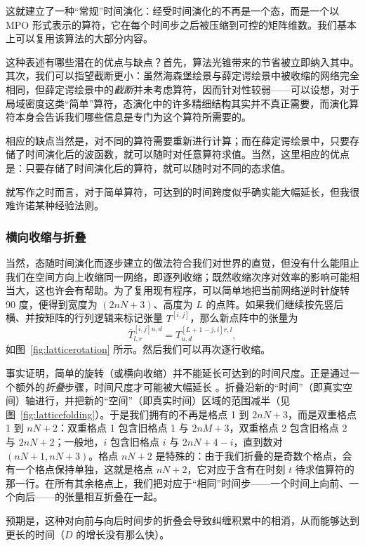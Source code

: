 \documentclass[a4paper,10pt,oneside,onecolumn,1p,times]{elsarticle}
\begin{document}
这就建立了一种“常规”时间演化：经受时间演化的不再是一个态，而是一个以 MPO 形式表示的算符，它在每个时间步之后被压缩到可控的矩阵维数。我们基本上可以复用该算法的大部分内容。

这种表述有哪些潜在的优点与缺点？首先，算法光锥带来的节省被立即纳入其中。其次，我们可以指望截断更小：虽然海森堡绘景与薛定谔绘景中被收缩的网络完全相同，但薛定谔绘景中的{\em 截断}并未考虑算符，因而针对性较弱——可以设想，对于局域密度这类“简单”算符，态演化中的许多精细结构其实并不真正需要，而演化算符本身会告诉我们哪些信息是专门为这个算符所需要的。

相应的缺点当然是，对不同的算符需要重新进行计算；而在薛定谔绘景中，只要存储了时间演化后的波函数，就可以随时对任意算符求值。当然，这里相应的优点是：只要存储了时间演化后的算符，就可以随时对不同的态求值。

就写作之时而言，对于简单算符，可达到的时间跨度似乎确实能大幅延长，但我很难许诺某种经验法则。

\subsubsection{横向收缩与折叠}

当然，态随时间演化而逐步建立的做法符合我们对世界的直觉，但没有什么能阻止我们在空间方向上收缩同一网络，即逐列收缩；既然收缩次序对效率的影响可能相当大，这也许会有帮助。为了复用现有程序，可以简单地把当前网络逆时针旋转 90 度，便得到宽度为 $(2nN+3)$、高度为 $L$ 的点阵。如果我们继续按先竖后横、并按矩阵的行列逻辑来标记张量 $T^{[i,j]}$，那么新点阵中的张量为
\begin{equation}
\overline{T}^{[i,j] u,d}_{l,r} = T^{[L+1-j,i] r,l}_{u,d} ,
\end{equation}
如图~\ref{fig:latticerotation} 所示。然后我们可以再次逐行收缩。

事实证明，简单的旋转（或横向收缩）并不能延长可达到的时间尺度。正是通过一个额外的{\em 折叠}步骤，时间尺度才可能被大幅延长 \cite{Banuls09}。折叠沿新的“时间”（即真实空间）轴进行，并把新的“空间”（即真实时间）区域的范围减半（见图~\ref{fig:latticefolding}）。于是我们拥有的不再是格点 1 到 $2nN+3$，而是双重格点 1 到 $nN+2$：双重格点 1 包含旧格点 1 与 $2nM+3$，双重格点 2 包含旧格点 2 与 $2nN+2$；一般地，$i$ 包含旧格点 $i$ 与 $2nN+4-i$，直到数对 $(nN+1, nN+3)$。格点 $nN+2$ 是特殊的：由于我们折叠的是奇数个格点，会有一个格点保持单独，这就是格点 $nN+2$，它对应于含有在时刻 $t$ 待求值算符的那一行。在所有其余格点上，我们把对应于“相同”时间步——一个时间上向前、一个向后——的张量相互折叠在一起。

预期是，这种对向前与向后时间步的折叠会导致纠缠积累中的相消，从而能够达到更长的时间（$D$ 的增长没有那么快）。
\end{document}
